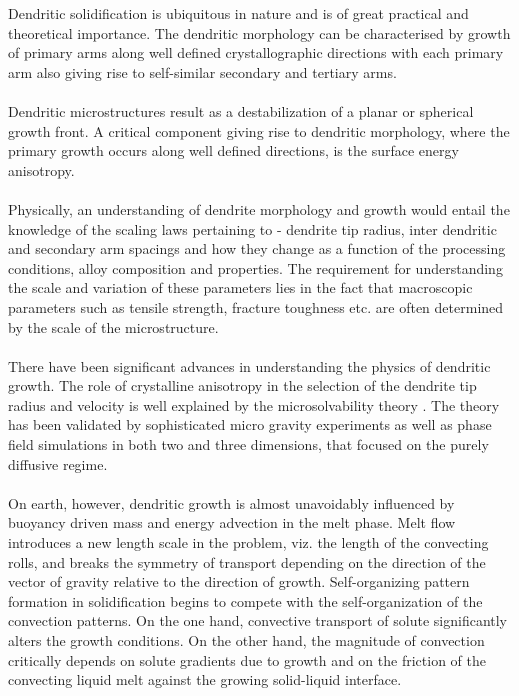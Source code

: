 \documentclass[12pt,a4paper]{report}
\begin{document}
Dendritic solidification is ubiquitous in nature and is of great practical and 
theoretical importance. The dendritic morphology can be characterised by growth of primary 
arms along well defined crystallographic directions with each primary arm also giving rise to 
self-similar secondary and tertiary arms.\\
\\
Dendritic microstructures result as a destabilization of a planar or spherical growth 
front. A critical component giving rise to dendritic morphology, where the primary growth occurs 
along well defined directions, is the surface energy anisotropy.\\
\\
Physically, an understanding of dendrite morphology and growth would entail the knowledge of the 
scaling laws pertaining to -  dendrite tip radius, inter dendritic and secondary arm spacings 
and how they change as a function of the processing conditions, alloy composition and properties.
The requirement for understanding the scale and variation of these parameters lies in the fact 
that macroscopic parameters such as tensile strength, fracture toughness etc. are often 
determined by the scale of the microstructure.\\
\\
There have been significant advances in understanding the physics of 
dendritic growth. The role of crystalline anisotropy in the selection of the dendrite 
tip radius and velocity is well explained by the microsolvability theory \cite{MS_theory}. 
The theory has been validated by sophisticated micro gravity experiments as well as phase field 
simulations in both two and three dimensions, that focused on the purely diffusive 
regime.\\
\\
On earth, however, dendritic growth is almost unavoidably influenced by buoyancy driven 
mass and energy advection in the melt phase. Melt flow introduces a new length scale in 
the problem, viz. the length of the convecting rolls, and breaks the symmetry of transport 
depending on the direction of the vector of gravity relative to the direction of growth. 
Self-organizing pattern formation in solidification begins to compete with the self-organization 
of the convection patterns. On the one hand, convective transport of solute significantly alters the 
growth conditions. On the other hand, the magnitude of convection critically depends on solute 
gradients due to growth and on the friction of the convecting liquid melt against the 
growing solid-liquid interface\cite{Stein}.
\end{document}
